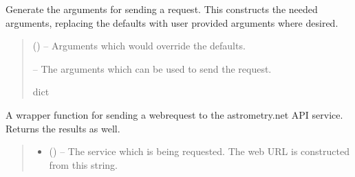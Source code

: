 \documentclass[letterpaper,11pt,english]{sphinxmanual}
\begin{document}
\begin{savenotes}
\begin{fulllineitems}
\begin{savenotes}\begin{fulllineitems}
\label{\detokenize{code/opihiexarata.astrometry.webclient:opihiexarata.astrometry.webclient.AstrometryNetWebAPIEngine._generate_upload_args}}
\pysigstartsignatures
{}
\pysigstopsignatures
\sphinxAtStartPar
Generate the arguments for sending a request. This constructs the
needed arguments, replacing the defaults with user provided arguments
where desired.
\begin{quote}\begin{description}
\sphinxAtStartPar
{} () – Arguments which would override the defaults.

\sphinxAtStartPar
{} – The arguments which can be used to send the request.

\sphinxAtStartPar
dict

\end{description}\end{quote}

\end{fulllineitems}\end{savenotes}


\begin{savenotes}\begin{fulllineitems}
\label{\detokenize{code/opihiexarata.astrometry.webclient:opihiexarata.astrometry.webclient.AstrometryNetWebAPIEngine._send_web_request}}
\pysigstartsignatures
{}
\pysigstopsignatures
\sphinxAtStartPar
A wrapper function for sending a webrequest to the astrometry.net API
service. Returns the results as well.
\begin{quote}\begin{description}
\begin{itemize}
\item {} 
\sphinxAtStartPar
{} () – The service which is being requested. The web URL is constructed
from this string.


\end{itemize}
\end{description}
\end{quote}
\end{fulllineitems}
\end{savenotes}
\end{fulllineitems}
\end{savenotes}
\end{document}
